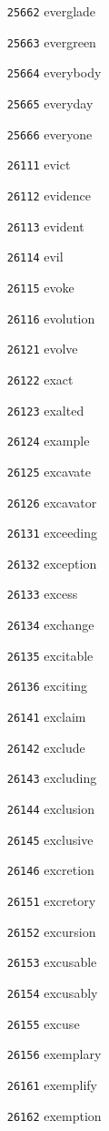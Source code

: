\documentclass[twoside,11pt]{article}
\begin{document}
\begin{multicols}{5}
\begin{enumerate}
\item[\texttt{25662}] everglade
\item[\texttt{25663}] evergreen
\item[\texttt{25664}] everybody
\item[\texttt{25665}] everyday
\item[\texttt{25666}] everyone
\item[\texttt{26111}] evict
\item[\texttt{26112}] evidence
\item[\texttt{26113}] evident
\item[\texttt{26114}] evil
\item[\texttt{26115}] evoke
\item[\texttt{26116}] evolution
\item[\texttt{26121}] evolve
\item[\texttt{26122}] exact
\item[\texttt{26123}] exalted
\item[\texttt{26124}] example
\item[\texttt{26125}] excavate
\item[\texttt{26126}] excavator
\item[\texttt{26131}] exceeding
\item[\texttt{26132}] exception
\item[\texttt{26133}] excess
\item[\texttt{26134}] exchange
\item[\texttt{26135}] excitable
\item[\texttt{26136}] exciting
\item[\texttt{26141}] exclaim
\item[\texttt{26142}] exclude
\item[\texttt{26143}] excluding
\item[\texttt{26144}] exclusion
\item[\texttt{26145}] exclusive
\item[\texttt{26146}] excretion
\item[\texttt{26151}] excretory
\item[\texttt{26152}] excursion
\item[\texttt{26153}] excusable
\item[\texttt{26154}] excusably
\item[\texttt{26155}] excuse
\item[\texttt{26156}] exemplary
\item[\texttt{26161}] exemplify
\item[\texttt{26162}] exemption

\end{enumerate}
\end{multicols}
\end{document}
